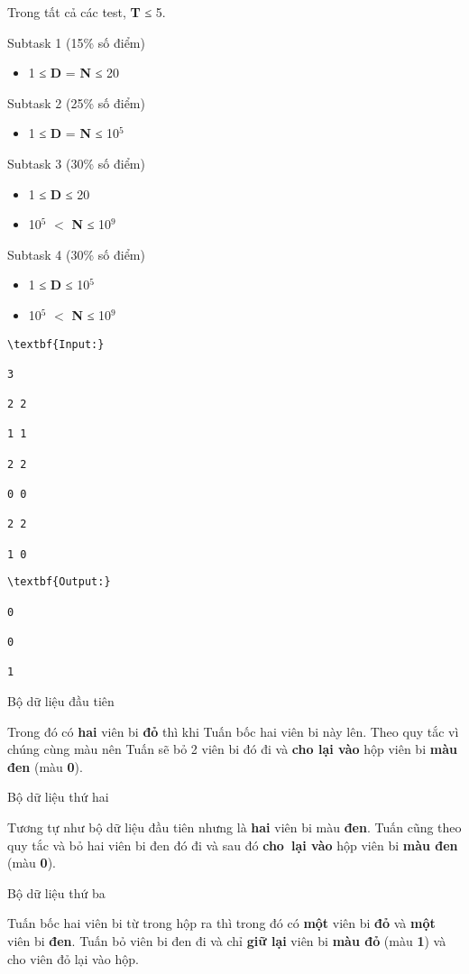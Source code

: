 Trong tất cả các test, \textbf{T} ≤ 5.

Subtask 1 (15\% số điểm)
\begin{itemize}
	\item 1 ≤ \textbf{D} = \textbf{N} ≤ 20
\end{itemize}

Subtask 2 (25\% số điểm)
\begin{itemize}
	\item 1 ≤ \textbf{D} = \textbf{N} ≤ 10$^5$
\end{itemize}

Subtask 3 (30\% số điểm)
\begin{itemize}
	\item 1 ≤ \textbf{D} ≤ 20
	\item 10$^5$ $<$ \textbf{N} ≤ 10$^9$
\end{itemize}

Subtask 4 (30\% số điểm)
\begin{itemize}
	\item 1 ≤ \textbf{D} ≤ 10$^5$
	\item 10$^5$ $<$ \textbf{N} ≤ 10$^9$
\end{itemize}
\begin{verbatim}
\textbf{Input:}

3

2 2

1 1

2 2

0 0

2 2

1 0\end{verbatim}
\begin{verbatim}
\textbf{Output:}

0

0

1\end{verbatim}
Bộ dữ liệu đầu tiên

Trong đó có \textbf{hai} viên bi \textbf{đỏ} thì khi Tuấn bốc hai viên bi này lên. Theo quy tắc vì chúng cùng màu nên Tuấn sẽ bỏ 2 viên bi đó đi và \textbf{cho lại vào} hộp viên bi \textbf{màu đen} (màu \textbf{0}).

Bộ dữ liệu thứ hai

Tương tự như bộ dữ liệu đầu tiên nhưng là \textbf{hai} viên bi màu \textbf{đen}. Tuấn cũng theo quy tắc và bỏ hai viên bi đen đó đi và sau đó \textbf{cho lại vào} hộp viên bi \textbf{màu đen} (màu \textbf{0}).

Bộ dữ liệu thứ ba

Tuấn bốc hai viên bi từ trong hộp ra thì trong đó có \textbf{một} viên bi \textbf{đỏ} và \textbf{một} viên bi \textbf{đen}. Tuấn bỏ viên bi đen đi và chỉ \textbf{giữ lại} viên bi \textbf{màu đỏ} (màu \textbf{1}) và cho viên đỏ lại vào hộp.